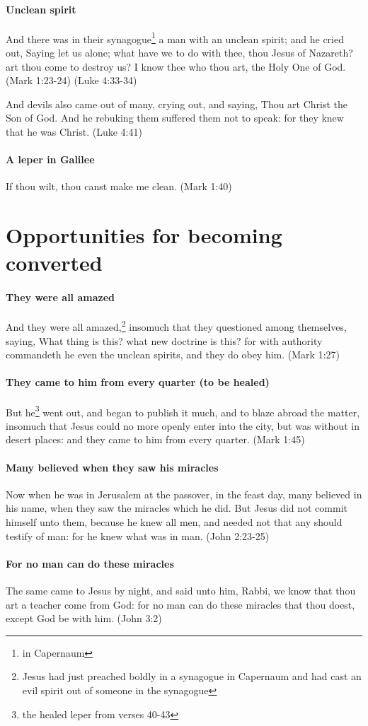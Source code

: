 \paragraph{Unclean spirit}
And there was in their synagogue\footnote{in Capernaum} a man with an unclean spirit; and he cried out, Saying let us alone; what have we to do with thee, thou Jesus of Nazareth? art thou come to destroy us? I know thee who thou art, the Holy One of God. (Mark 1:23-24) (Luke 4:33-34)

And devils also came out of many, crying out, and saying, Thou art Christ the Son of God. And he rebuking them suffered them not to speak: for they knew that he was Christ. (Luke 4:41)

\paragraph{A leper in Galilee}
If thou wilt, thou canst make me clean. (Mark 1:40)

\section{Opportunities for becoming converted}

\paragraph{They were all amazed}
And they were all amazed,\footnote{Jesus had just preached boldly in a synagogue in Capernaum and had cast an evil spirit out of someone in the synagogue} insomuch that they questioned among themselves, saying, What thing is this? what new doctrine is this? for with authority commandeth he even the unclean spirits, and they do obey him. (Mark 1:27)

\paragraph{They came to him from every quarter (to be healed)}
But he\footnote{the healed leper from verses 40-43} went out, and began to publish it much, and to blaze abroad the matter, insomuch that Jesus could no more openly enter into the city, but was without in desert places: and they came to him from every quarter. (Mark 1:45)

\paragraph{Many believed when they saw his miracles}
Now when he was in Jerusalem at the passover, in the feast day, many believed in his name, when they saw the miracles which he did. But Jesus did not commit himself unto them, because he knew all men, and needed not that any should testify of man: for he knew what was in man. (John 2:23-25)

\paragraph{For no man can do these miracles}
The same came to Jesus by night, and said unto him, Rabbi, we know that thou art a teacher come from God: for no man can do these miracles that thou doest, except God be with him. (John 3:2)
